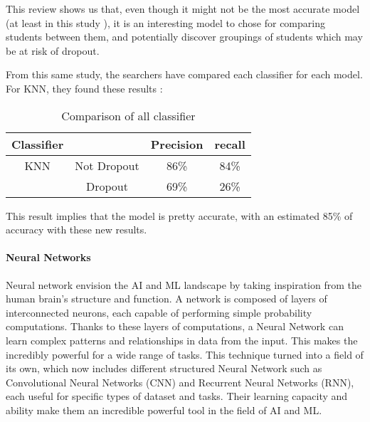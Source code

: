 This review shows us that, even though it  might not be the most accurate model (at least in this study \cite{shiful_machine_2021}), it is an interesting model to chose for comparing students between them, and potentially discover groupings of students which may be at risk of dropout.

From this same study, the searchers have compared each classifier for each model. For KNN, they found these results :
\begin{table}[H]
    \centering
    \caption{Comparison of all classifier\cite{shiful_machine_2021}}
    \begin{tabular}{|c|c|c|c|}
        \hline
        \textbf{Classifier} & & \textbf{Precision} & \textbf{recall}\\
        \hline
        KNN & Not Dropout & 86\% & 84\% \\
        \cline{2-4} 
        & Dropout & 69\% & 26\% \\
        \hline
    \end{tabular}
    \label{tab:compar_classifier_shiful}
\end{table}

This result implies that the model is pretty accurate, with an estimated 85\% of accuracy with these new results.

\vspace{8pt}
\paragraph{Neural Networks}
Neural network envision the AI and ML landscape by taking inspiration from the human brain's structure and function. A network is composed of layers of interconnected neurons, each capable of performing simple probability computations. Thanks to these layers of computations, a Neural Network can learn complex patterns and relationships in data from the input. This makes the incredibly powerful for a wide range of tasks. 
This technique turned into a field of its own, which now includes different structured Neural Network such as Convolutional Neural Networks (CNN) and Recurrent Neural Networks (RNN), each useful for specific types of dataset and tasks. Their learning capacity and ability make them an incredible powerful tool in the field of AI and ML. 

